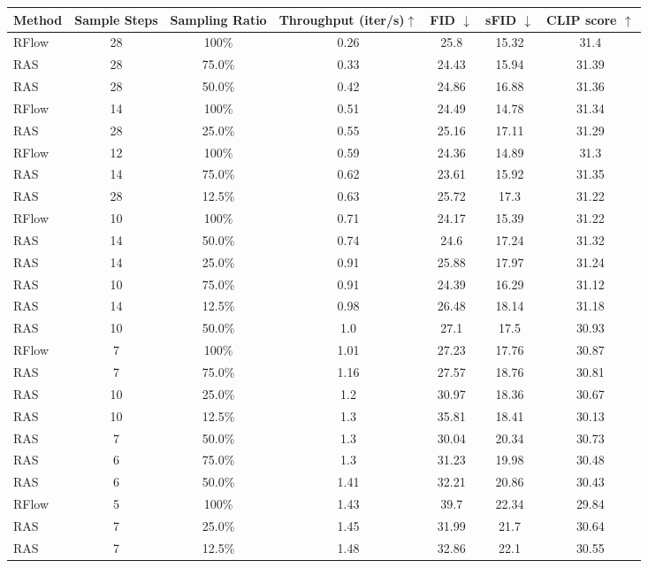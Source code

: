 \begin{table*}[th]
\centering
\begin{tabular}{lcccccc}
\hline
Method & Sample Steps & Sampling Ratio & Throughput (iter/s)$\uparrow$ & FID $\downarrow$ & sFID $\downarrow$ & CLIP score $\uparrow$ \\
\hline
\rowcolor{gray!10}
RFlow & 28 & 100\% & 0.26 & 25.8 & 15.32 & 31.4 \\
RAS & 28 & 75.0\% & 0.33 & 24.43 & 15.94 & 31.39 \\
RAS & 28 & 50.0\% & 0.42 & 24.86 & 16.88 & 31.36 \\
\rowcolor{gray!10}
RFlow & 14 & 100\% & 0.51 & 24.49 & 14.78 & 31.34 \\
RAS & 28 & 25.0\% & 0.55 & 25.16 & 17.11 & 31.29 \\
\rowcolor{gray!10}
RFlow & 12 & 100\% & 0.59 & 24.36 & 14.89 & 31.3 \\
RAS & 14 & 75.0\% & 0.62 & 23.61 & 15.92 & 31.35 \\
RAS & 28 & 12.5\% & 0.63 & 25.72 & 17.3 & 31.22 \\

\rowcolor{gray!10}
RFlow & 10 & 100\% & 0.71 & 24.17 & 15.39 & 31.22 \\


RAS & 14 & 50.0\% & 0.74 & 24.6 & 17.24 & 31.32 \\
RAS & 14 & 25.0\% & 0.91 & 25.88 & 17.97 & 31.24 \\

RAS & 10 & 75.0\% & 0.91 & 24.39 & 16.29 & 31.12 \\
RAS & 14 & 12.5\% & 0.98 & 26.48 & 18.14 & 31.18 \\
RAS & 10 & 50.0\% & 1.0 & 27.1 & 17.5 & 30.93 \\
\rowcolor{gray!10}
RFlow & 7 & 100\% & 1.01 & 27.23 & 17.76 & 30.87 \\

RAS & 7 & 75.0\% & 1.16 & 27.57 & 18.76 & 30.81 \\
RAS & 10 & 25.0\% & 1.2 & 30.97 & 18.36 & 30.67 \\
RAS & 10 & 12.5\% & 1.3 & 35.81 & 18.41 & 30.13 \\


RAS & 7 & 50.0\% & 1.3 & 30.04 & 20.34 & 30.73 \\
RAS & 6 & 75.0\% & 1.3 & 31.23 & 19.98 & 30.48 \\
RAS & 6 & 50.0\% & 1.41 & 32.21 & 20.86 & 30.43 \\
\rowcolor{gray!10}
RFlow & 5 & 100\% & 1.43 & 39.7 & 22.34 & 29.84 \\
RAS & 7 & 25.0\% & 1.45 & 31.99 & 21.7 & 30.64 \\
RAS & 7 & 12.5\% & 1.48 & 32.86 & 22.1 & 30.55 \\


\end{tabular}
\end{table*}
